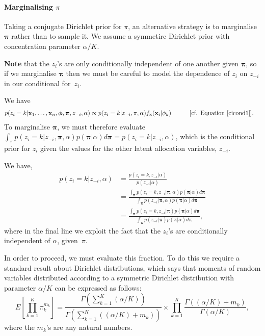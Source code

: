 \documentclass[12pt]{article}
\begin{document}
\paragraph{Marginalising $\pi$}
Taking a conjugate Dirichlet prior for $\pi$, an alternative strategy is to marginalise $\boldsymbol{\pi}$ rather than to sample it.  We assume a symmetirc Dirichlet prior with concentration parameter $\alpha/K$.  

{\bf Note} that the $z_i$'s are only conditionally independent of one another given $\boldsymbol{\pi}$, so if we marginalise $\boldsymbol{\pi}$ then we must be careful to model the dependence of $z_i$ on $z_{-i}$ in our conditional for~$z_i$. 

We have    
\begin{align}
p(z_i = k| {\bf x}_1,\ldots, {\bf x}_n,\boldsymbol{\phi}, \boldsymbol{\pi}, z_{-i}, \alpha) &\propto p(z_i=k|z_{-i}, \pi, \alpha) f_{\bf x}({\bf x}_i | \phi_k) \mbox{\quad\quad\quad [cf. Equation \eqref{cicond1}]}.%
\end{align}
To marginalise $\boldsymbol{\pi}$, we must therefore evaluate $\int_\pi p(z_i=k|z_{-i}, \boldsymbol{\pi}, \alpha) p(\boldsymbol{\pi}|\alpha)d\boldsymbol{\pi} = p(z_i=k|z_{-i}, \alpha)$, which is the conditional prior for $z_i$ given the values for the other latent allocation variables, $z_{-i}$.  

We have,
\begin{align}
p(z_i=k|z_{-i}, \alpha) &= \frac{p(z_i=k,z_{-i}|  \alpha)}{p(z_{-i}|  \alpha)} \\
&= \frac{\int_{\boldsymbol{\pi}} p(z_i=k,z_{-i}| \boldsymbol{\pi}, \alpha)p(\boldsymbol{\pi}|\alpha)d\boldsymbol{\pi}}{ \int_{\boldsymbol{\pi}} p(z_{-i}| \boldsymbol{\pi}, \alpha)p(\boldsymbol{\pi}|\alpha)d\boldsymbol{\pi}}\\
&= \frac{\int_{\boldsymbol{\pi}} p(z_i=k,z_{-i}| \boldsymbol{\pi})p(\boldsymbol{\pi}|\alpha)d\boldsymbol{\pi}}{ \int_{\boldsymbol{\pi}} p(z_{-i}| \boldsymbol{\pi})p(\boldsymbol{\pi}|\alpha)d\boldsymbol{\pi}}, \label{cicond2}  
\end{align}
where in the final line we exploit the fact that the $z_i$'s are conditionally independent of $\alpha$, given~$\pi$.

In order to proceed, we must evaluate this fraction.  To do this we require a standard result about Dirichlet distributions, which says that moments of random variables distributed according to a symmetric Dirichlet distribution with parameter $\alpha/K$ can be expressed as follows:
\begin{equation}
E\left[\prod_{k = 1}^K \pi_k^{m_k} \right] = \frac{\Gamma(\sum_{k=1}^K (\alpha/K))}{\Gamma(\sum_{k=1}^K ((\alpha/K) + m_k))}\times \prod_{k=1}^K \frac{\Gamma ((\alpha/K) + m_k)}{\Gamma(\alpha/K)},\label{standard}
\end{equation}
where the $m_k$'s are any natural numbers. 
\end{document}
